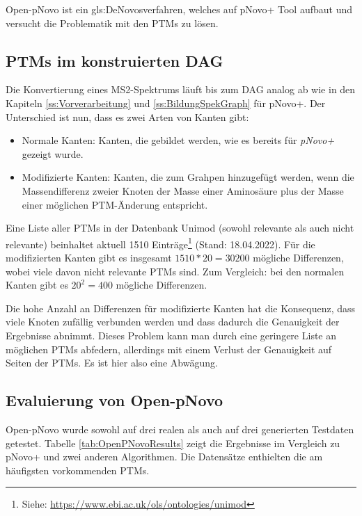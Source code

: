 \documentclass[a4paper, 12pt]{article}
\newcommand{\gerquot}[1]{\glqq#1\grqq}
\begin{document}
Open-pNovo ist ein \gls{gls:DeNovo}sverfahren, welches auf pNovo+ Tool aufbaut und versucht die Problematik mit den PTMs zu lösen.

\subsection{PTMs im konstruierten DAG}
Die Konvertierung eines MS2-Spektrums läuft bis zum DAG analog ab wie in den Kapiteln \ref{ss:Vorverarbeitung} und \ref{ss:BildungSpekGraph} für pNovo+. Der Unterschied ist nun, dass es zwei Arten von Kanten gibt:

\begin{itemize}
   \item \gerquot{Normale} Kanten: Kanten, die gebildet werden, wie es bereits für \emph{pNovo+} gezeigt wurde. 
   \item \gerquot{Modifizierte} Kanten: Kanten, die zum Grahpen hinzugefügt werden, wenn die Massendifferenz zweier Knoten der Masse einer Aminosäure plus der Masse einer möglichen PTM-Änderung entspricht. 
\end{itemize}

Eine Liste aller PTMs in der Datenbank Unimod (sowohl relevante als auch nicht relevante) beinhaltet aktuell 1510 Einträge\footnote{Siehe: \url{https://www.ebi.ac.uk/ols/ontologies/unimod}} (Stand: 18.04.2022). Für die modifizierten Kanten gibt es insgesamt $ 1510 * 20 = 30200 $ mögliche Differenzen, wobei viele davon nicht relevante PTMs sind. Zum Vergleich: bei den normalen Kanten gibt es $ 20^2 = 400 $ mögliche Differenzen.

Die hohe Anzahl an Differenzen für modifizierte Kanten hat die Konsequenz, dass viele Knoten zufällig verbunden werden und dass dadurch die Genauigkeit der Ergebnisse abnimmt. Dieses Problem kann man durch eine geringere Liste an möglichen PTMs abfedern, allerdings mit einem Verlust  der Genauigkeit auf Seiten der PTMs. Es ist hier also eine Abwägung.

\subsection{Evaluierung von Open-pNovo}
Open-pNovo wurde sowohl auf drei realen als auch auf drei generierten Testdaten getestet. Tabelle \ref{tab:OpenPNovoResults} zeigt die Ergebnisse im Vergleich zu pNovo+ und zwei anderen Algorithmen. Die Datensätze enthielten die am häufigsten vorkommenden PTMs.
\end{document}
